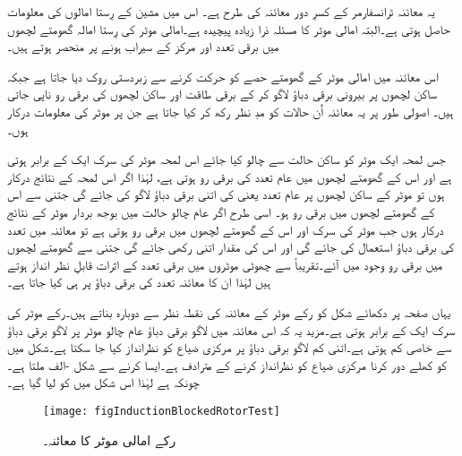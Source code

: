 یہ معائنہ ٹرانسفارمر کے کسرِ دور معائنہ کی طرح ہے۔ اس میں مشین کے رِستا امالوں کی معلومات حاصل ہوتی ہے۔البتہ امالی موٹر کا مسئلہ ذرا زیادہ پیچیدہ ہے۔امالی موٹر کی رِستا امالہ گھومتے لچھوں میں برقی تعدد اور مرکز کے سیراب ہونے پر منحصر ہوتے ہیں۔

 اس معائنہ میں امالی موٹر کے گھومتے حصے کو حرکت کرنے سے زبردستی روک دیا جاتا ہے جبکہ ساکن لچھوں پر بیرونی برقی دباؤ  لاگو کر کے برقی طاقت  اور ساکن لچھوں کی برقی رو  ناپی جاتی ہیں۔ اصولی طور پر یہ معائنہ اُن حالات کو مدِ نظر رکھ کر کیا جاتا ہے جن پر موٹر کی معلومات درکار ہوں۔

جس لمحہ ایک موٹر کو ساکن حالت سے چالو کیا جائے اس لمحہ موٹر کی سرک ایک کے برابر ہوتی ہے اور اس کے گھومتے لچھوں میں عام تعدد   کی برقی رو  ہوتی ہے، لہٰذا اگر اس لمحہ کے نتائج درکار ہوں تو موٹر کے ساکن لچھوں پر عام تعدد یعنی   کی اتنی برقی دباؤ لاگو کی جائے گی جتنی سے اس کے گھومتے لچھوں میں برقی رو  ہو۔ اسی طرح اگر عام چالو حالت میں بوجھ بردار موٹر کے نتائج درکار ہوں جب موٹر کی سرک  اور اس کے گھومتے لچھوں میں برقی رو  ہوتی ہے تو معائنہ میں  تعدد کی برقی دباؤ استعمال کی جائے گی اور اس کی مقدار اتنی رکھی جائے گی جتنی سے گھومتے لچھوں میں  برقی رو وجود میں آئے۔تقریباً   سے چھوٹی موٹروں میں برقی تعدد کے اثرات قابلِ نظر انداز ہوتے ہیں لہٰذا ان کا معائنہ  تعدد کی برقی دباؤ پر ہی کیا جاتا ہے۔

یہاں صفحہ  پر دکھائے شکل   کو رکے موٹر کے معائنہ کی نقطہ نظر سے دوبارہ بناتے ہیں۔رکے موٹر کی سرک ایک کے برابر ہوتی ہے۔مزید یہ کہ اس معائنہ میں لاگو برقی دباؤ عام چالو موٹر پر لاگو برقی دباؤ سے خاصی کم ہوتی ہے۔اتنی کم لاگو برقی دباؤ پر مرکزی ضیاع کو نظرانداز کیا جا سکتا ہے۔شکل میں   کو کھلے دور کرنا مرکزی ضیاع کو نظرانداز کرنے کے مترادف ہے۔ایسا کرنے سے شکل -الف ملتا ہے۔چونکہ  ہے لہٰذا اس شکل میں   کو  لیا گیا ہے۔
\begin{figure}
\centering
\texttt{[image: figInductionBlockedRotorTest]}
\caption{رکے امالی موٹر کا معائنہ۔}
\label{شکل_امالی_رکے_موٹر_معائنہ}
\end{figure}

